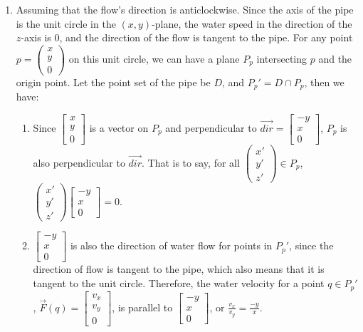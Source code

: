 \begin{exercise}{8}
\begin{enumerate}
    \item Assuming that the flow's direction is anticlockwise. Since the axis of the pipe is the unit circle in the $(x, y)$-plane, the water speed in the direction of the $z$-axis is 0, and the direction of the flow is tangent to the pipe. For any point $p = \begin{pmatrix}x\\y\\0\end{pmatrix}$ on this unit circle, we can have a plane $P_p$ intersecting $p$ and the origin point. Let the point set of the pipe be $D$, and $P_p' = D \cap P_p$, then we have:
    
    \begin{enumerate}
      \item Since $\begin{bmatrix}x\\y\\0\end{bmatrix}$ is a vector on $P_p$ and perpendicular
      to $\vec{dir} = \begin{bmatrix}-y\\x\\0\end{bmatrix}$, $P_p$ is also perpendicular to
      $\vec{dir}$. That is to say, for all $\begin{pmatrix}x'\\y'\\z'\end{pmatrix} \in P_p$, $\begin{pmatrix}x'\\y'\\z'\end{pmatrix}\begin{bmatrix}-y\\x\\0\end{bmatrix} = 0$.
      
      \item $\begin{bmatrix}-y\\x\\0\end{bmatrix}$ is also the direction of water flow for points
      in $P_p'$, since the direction of flow is tangent to the pipe, which also means that
      it is tangent to the unit circle. Therefore, the water velocity for a point
      $q \in P_p'$, $\vec{F}(q) = \begin{bmatrix}v_x\\v_y\\0\end{bmatrix}$, is parallel to
      $\begin{bmatrix}-y\\x\\0\end{bmatrix}$, or $\frac{v_x}{v_y} = \frac{-y}{x}$.
    \end{enumerate}
    

\end{enumerate}
\end{exercise}
